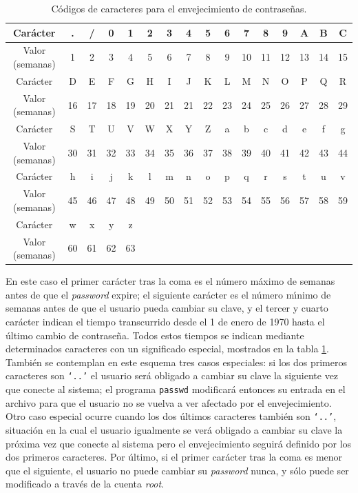 \begin{table}
\begin{center}
\begin{tabular}{|c||c|c|c|c|c|c|c|c|c|c|c|c|c|c|c|}
\hline
Car\'acter & . & / & 0 & 1 & 2 & 3 & 4 & 5 & 6 & 7 & 8 & 9 & A & B & C\\
\hline
Valor (semanas) & 1 & 2 & 3 & 4 & 5 & 6 & 7 & 8 & 9 & 10 & 11 & 12 & 13 & 14 & 15 \\
\hline
Car\'acter & D & E & F & G & H & I & J & K & L & M & N & O & P & Q & R\\ 
\hline
Valor (semanas) & 16 & 17 & 18 & 19 & 20 & 21 & 21 & 22 & 23 & 24 & 25 & 26 & 27 & 28 & 29\\ 
\hline
Car\'acter & S & T & U & V & W & X & Y & Z & a & b & c & d & e & f & g\\
\hline
Valor (semanas) & 30 & 31 & 32 & 33 & 34 & 35 & 36 & 37 & 38 & 39 & 40 & 41 & 42 & 43 & 44\\ 
\hline
Car\'acter & h & i & j & k & l & m & n & o & p & q & r & s & t & u & v\\
\hline
Valor (semanas) & 45 & 46 & 47 & 48 & 49 & 50 & 51 & 52 & 53 & 54 & 55 & 56 & 57 & 58 & 59\\
\hline
Car\'acter & w & x & y & z &&&&&&&&&&&\\
\hline
Valor (semanas) & 60 & 61 & 62 & 63 &&&&&&&&&&&\\
\hline
\end{tabular}
\end{center}
\caption{C\'odigos de caracteres para el envejecimiento de contrase\~nas.}
\label{agingcodes}
\end{table}
En este caso el primer car\'acter tras la coma es el n\'umero m\'aximo de 
semanas antes de que el {\it password} expire; el siguiente car\'acter es el 
n\'umero m\'{\i}nimo de semanas antes de que el usuario pueda cambiar su clave,
y el tercer y cuarto car\'acter indican el tiempo transcurrido desde el 1 de
enero de 1970 hasta el \'ultimo cambio de contrase\~na. Todos estos tiempos
se indican mediante determinados caracteres con un significado especial, 
mostrados en la tabla \ref{agingcodes}. Tambi\'en se contemplan en este esquema
tres casos especiales: si los dos primeros caracteres son {\tt `..'} el usuario
ser\'a obligado a cambiar su clave la siguiente vez que conecte al sistema; el
programa {\tt passwd} modificar\'a entonces su entrada en el archivo para que
el usuario no se vuelva a ver afectado por el envejecimiento. Otro caso especial
ocurre cuando los dos \'ultimos caracteres tambi\'en son {\tt `..'}, situaci\'on
en la cual el usuario igualmente se ver\'a obligado a cambiar su clave la
pr\'oxima vez que conecte al sistema pero el envejecimiento seguir\'a definido
por los dos primeros caracteres. Por \'ultimo, si el primer car\'acter tras la
coma es menor que el siguiente, el usuario no puede cambiar su {\it password}
nunca, y s\'olo puede ser modificado a trav\'es de la cuenta {\it root}.

